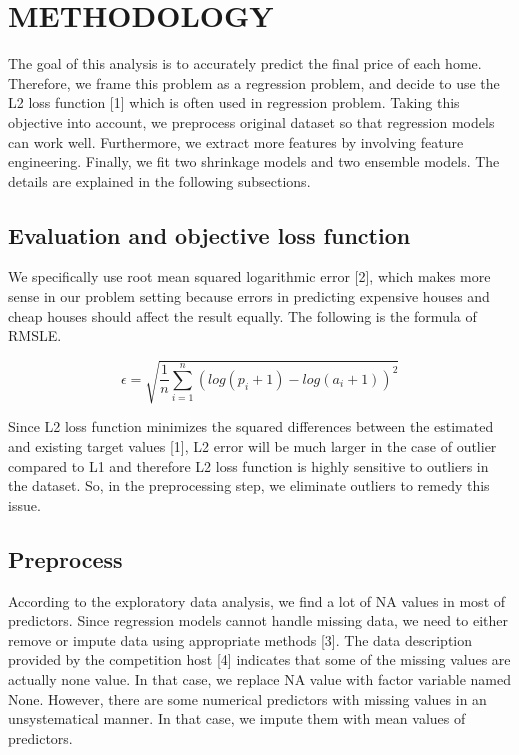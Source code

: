 \documentclass[letterpaper, 10 pt, conference]{ieeeconf}\usepackage[]{graphicx}\usepackage[]{color}
\begin{document}
\section{METHODOLOGY}

The goal of this analysis is to accurately predict the final price of each home. Therefore, we frame this problem as a regression problem, and decide to use the L2 loss function [1] which is often used in regression problem. Taking this objective into account, we preprocess original dataset so that regression models can work well. Furthermore, we extract more features by involving feature engineering. Finally, we fit two shrinkage models and two ensemble models. The details are explained in the following subsections.

\subsection{Evaluation and objective loss function}

We specifically use root mean squared logarithmic error [2], which makes more sense in our problem setting because errors in predicting expensive houses and cheap houses should affect the result equally. The following is the formula of RMSLE.

$$
\epsilon = \sqrt{\frac{1}{n} \sum_{i=1}^{n} (log(p_{i} + 1) - log(a_{i} + 1))^2}
$$

Since L2 loss function minimizes the squared differences between the estimated and existing target values [1], L2 error will be much larger in the case of outlier compared to L1 and therefore L2 loss function is highly sensitive to outliers in the dataset. So, in the preprocessing step, we eliminate outliers to remedy this issue.

\subsection{Preprocess}
According to the exploratory data analysis, we find a lot of NA values in most of predictors. Since regression models cannot handle missing data, we need to either remove or impute data using appropriate methods [3]. The data description provided by the competition host [4] indicates that some of the missing values are actually none value. In that case, we replace NA value with factor variable named None. However, there are some numerical predictors with missing values in an unsystematical manner. In that case, we impute them with mean values of predictors.
\end{document}
